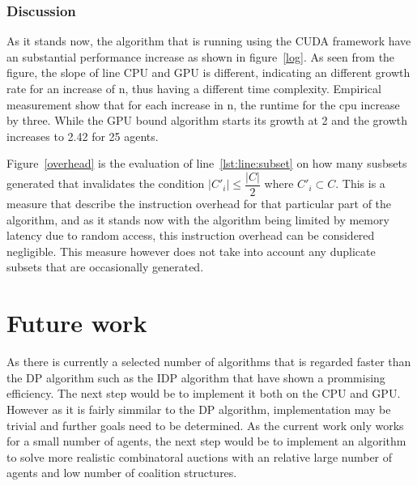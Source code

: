 \documentclass[a4paper, 12pt]{report}
\begin{document}
\subsection*{Discussion}
As it stands now, the algorithm that is running using the CUDA framework have an substantial performance increase as shown in figure~\ref{log}. As seen from the figure, the slope of line CPU and GPU is different, indicating an different growth rate for an increase of n, thus having a different time complexity. Empirical measurement show that for each increase in n, the runtime for the cpu increase by three. While the GPU bound algorithm starts its growth at 2 and the growth increases to 2.42 for 25 agents.

Figure~\ref{overhead} is the evaluation of line~\ref{lst:line:subset} on how many susbsets generated that invalidates the condition $\vert C'_{i} \vert \leq \dfrac{\vert C\vert }{2}$ where $C'_i \subset C$. This is a measure that describe the instruction overhead for that particular part of the algorithm, and as it stands now with the algorithm being limited by memory latency due to random access, this instruction overhead can be considered negligible. This measure however does not take into account any duplicate subsets that are occasionally generated.
\chapter*{Future work}
As there is currently a selected number of algorithms that is regarded faster than the DP algorithm such as the IDP algorithm \citep{rahwan2008improved} that have shown a prommising efficiency. The next step would be to implement it both on the CPU and GPU. However as it is fairly simmilar to the DP algorithm, implementation may be trivial and further goals need to be determined. As the current work only works for a small number of agents, the next step would be to implement an algorithm to solve more realistic combinatoral auctions with an relative large number of agents and low number of coalition structures.



\end{document}
